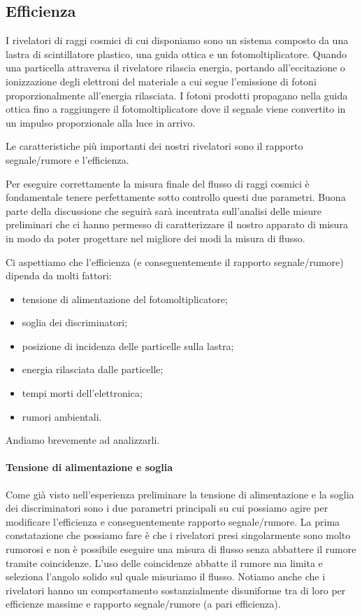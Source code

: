 \subsection{Efficienza}

I rivelatori di raggi cosmici di cui disponiamo sono un sistema composto da una lastra di scintillatore plastico, una guida ottica e un fotomoltiplicatore.
Quando una particella attraversa il rivelatore rilascia energia, portando all'eccitazione o ionizzazione degli elettroni del materiale a cui segue l'emissione di fotoni proporzionalmente all'energia rilasciata.
I fotoni prodotti propagano nella guida ottica fino a raggiungere il fotomoltiplicatore dove il segnale viene convertito in un impulso proporzionale alla luce in arrivo.

Le caratteristiche più importanti dei nostri rivelatori sono il rapporto segnale/rumore e l'efficienza.

Per eseguire correttamente la misura finale del flusso di raggi cosmici è fondamentale tenere perfettamente sotto controllo questi due parametri. Buona parte della discussione che seguirà sarà incentrata sull'analisi delle misure preliminari che ci hanno permesso di caratterizzare il nostro apparato di misura in modo da poter progettare nel migliore dei modi la misura di flusso.

Ci aspettiamo che l'efficienza (e conseguentemente il rapporto segnale/rumore) dipenda da molti fattori:
\begin{itemize}
	\item tensione di alimentazione del fotomoltiplicatore;
	\item soglia dei discriminatori;
	\item posizione di incidenza delle particelle sulla lastra;
	\item energia rilasciata dalle particelle;
	\item tempi morti dell'elettronica;
	\item rumori ambientali.
\end{itemize}
Andiamo brevemente ad analizzarli.

\paragraph{Tensione di alimentazione e soglia}
Come già visto nell'esperienza preliminare la tensione di alimentazione e la soglia dei discriminatori sono i due parametri principali su cui possiamo agire per modificare l'efficienza e conseguentemente rapporto segnale/rumore. La prima constatazione che possiamo fare è che i rivelatori presi singolarmente sono molto rumorosi e non è possibile eseguire una misura di flusso senza abbattere il rumore tramite coincidenze. L'uso delle coincidenze abbatte il rumore ma limita e seleziona l'angolo solido sul quale misuriamo il flusso. Notiamo anche che i rivelatori  hanno un comportamento sostanzialmente disuniforme tra di loro per efficienze massime e rapporto segnale/rumore (a pari efficienza).

